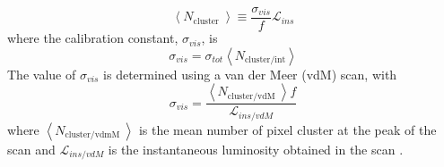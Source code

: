 \begin{equation}
    \left\langle N_{\text {cluster }}\right\rangle\equiv\frac{\sigma_{vis}}{f}\mathcal{L}_{ins}
\end{equation}
where the calibration constant, $\sigma_{vis}$, is   
\begin{equation}
    \sigma_{vis}=\sigma_{tot}\left\langle N_{\text {cluster/int}}\right\rangle
\end{equation}
The value of $\sigma_{vis}$ is determined using a van der Meer (vdM) scan, with 
\begin{equation}
    \sigma_{vis}= \frac{\left\langle N_{\text {cluster/vdM }}\right\rangle f }{\mathcal{L}_{ins/vdM}}
\end{equation}
where $\left\langle N_{\text {cluster/vdmM }}\right\rangle$ is the mean number of pixel cluster at the peak of the scan and $\mathcal{L}_{ins/vdM}$ is the instantaneous luminosity obtained in the scan \cite{CMS-PAS-LUM-12-001}.



